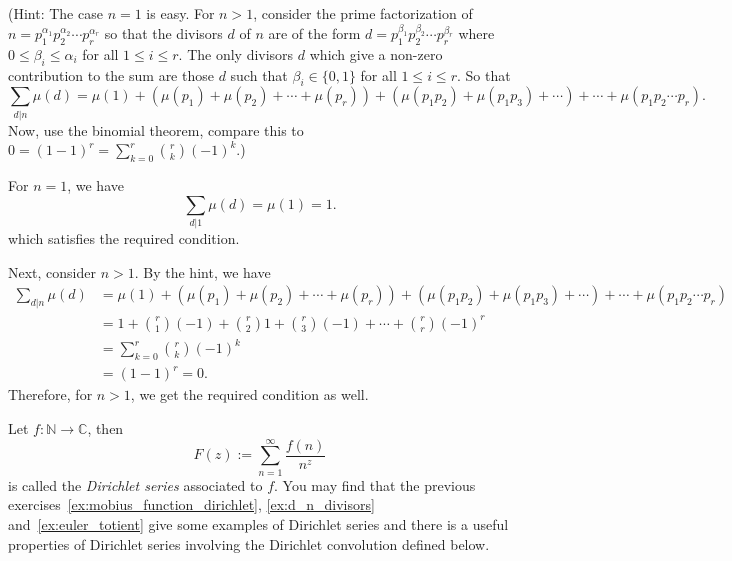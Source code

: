 \documentclass{elegantbook}
\begin{document}
\begin{problemset}[Exercises]
  (Hint: The case $n=1$ is easy. For $n>1$, consider the prime factorization of $n=p_1^{\alpha_1} p_2^{\alpha_2} \cdots p_r^{\alpha_r}$ so that the divisors $d$ of $n$ are of the form $d=p_1^{\beta_1} p_2^{\beta_2} \cdots p_r^{\beta_r}$ where $0 \leq \beta_i \leq \alpha_i$ for all $1 \leq i \leq r$. The only divisors $d$ which give a non-zero contribution to the sum are those $d$ such that $\beta_i \in \{0,1\}$ for all $1 \leq i \leq r$. So that
  \[
    \sum_{d|n} \mu(d) = \mu(1) + \left( \mu(p_1) + \mu(p_2) + \cdots + \mu(p_r) \right) + \left( \mu(p_1 p_2) + \mu(p_1 p_3) + \cdots \right) + \cdots + \mu(p_1 p_2 \cdots p_r).
  \]
  Now, use the binomial theorem, compare this to $0=(1-1)^r=\sum_{k=0}^r \binom{r}{k} (-1)^k$.)
  \begin{solution}
    For $n=1$, we have
    \[
      \sum_{d|1} \mu(d) = \mu(1) = 1.
    \]
    which satisfies the required condition.

    Next, consider $n>1$. By the hint, we have
    \[
    \begin{aligned}
      \sum_{d|n} \mu(d) &= \mu(1) + \left( \mu(p_1) + \mu(p_2) + \cdots + \mu(p_r) \right) + \left( \mu(p_1 p_2) + \mu(p_1 p_3) + \cdots \right) + \cdots + \mu(p_1 p_2 \cdots p_r) \\
      &= 1 + \binom{r}{1}(-1) + \binom{r}{2} 1 + \binom{r}{3}(-1) + \cdots + \binom{r}{r}(-1)^r \\
      &= \sum_{k=0}^r \binom{r}{k} (-1)^k \\
      &= (1 - 1)^r = 0.
    \end{aligned}
    \]
    Therefore, for $n>1$, we get the required condition as well.
  \end{solution}
  \vspace{30pt}
  Let $f:\mathbb{N} \to \mathbb{C}$, then
  \[
    F(z) := \sum_{n=1}^{\infty} \frac{f(n)}{n^z}
  \]
  is called the \textit{Dirichlet series} associated to $f$. You may find that the previous exercises~\ref{ex:mobius_function_dirichlet}, \ref{ex:d_n_divisors} and~\ref{ex:euler_totient} give some examples of Dirichlet series and there is a useful properties of Dirichlet series involving the Dirichlet convolution defined below.


\end{problemset}
\end{document}
